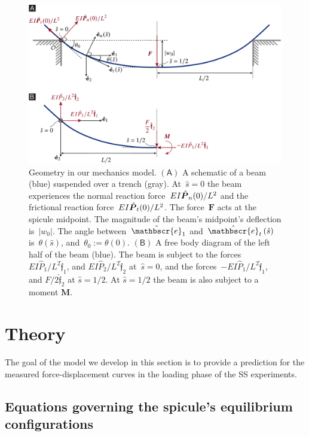 \documentclass[preprint,10pt,times]{elsarticle}
\numberwithin{equation}{section}
\newcommand{\physe}{\hat{\mathbscr{e}}} %
\newcommand{\physf}{\hat{\boldsymbol{\mathfrak{f}}}}
\renewcommand{\u}[1]{\boldsymbol{#1}}
\newcommand{\chat}[1]{\skew{4}\hat{#1}}
\newcommand{\pr}[1]{\left( #1 \right)}
\newcommand{\subf}[1]{\pr{\textsf{#1}}}
\begin{document}
\begin{figure}
\centering{}\includegraphics[width=1\textwidth]{../Figures_Submit/BeamSchematic_V15.pdf}
\caption{
\label{fig:BeamSchematic}
Geometry in our mechanics model. %
$\subf{A}$ A schematic of a beam (blue) suspended over a trench (gray). %
At~$\hat{s} = 0$ the beam  experiences the normal reaction
force~$E I\chat{\u{P}}_n(0)/L^2$ and the
frictional reaction force~$E I\chat{\u{P}}_t(0)/L^2$. %
The force~$\u{F}$ acts at the spicule midpoint. %
The magnitude of the beam's midpoint's deflection is~$|w_0|$. %
The angle between~$\physe_1$ and~$\physe_{t}\pr{\hat{s}}$ is~$\theta\pr{\hat{s}}$, and~$\theta_0 :=\theta(0)$. %
$\subf{B}$ A free body diagram of the left half of the beam (blue). %
The beam is subject to the
forces~$E I\hat{P}_1/L^2\physf_1$, and $E I\hat{P}_2/L^2\physf_2$ at~$\hat{s} = 0$,
and the forces~$-E I\hat{P}_1/L^2\physf_1$, and $F/2\physf_{2}$ at $\hat{s}=1/2$. %
At $\hat{s}=1/2$ the beam is also subject to a moment $\u{M}$. %
}
\end{figure}

\section{Theory\label{sec:results}}

The goal of the model we develop in this section is to provide a prediction
for the measured force-displacement curves in the loading phase of the
SS experiments.

\subsection{Equations governing the spicule's equilibrium configurations\label{subsec:Governing-equations-of}}
\end{document}
